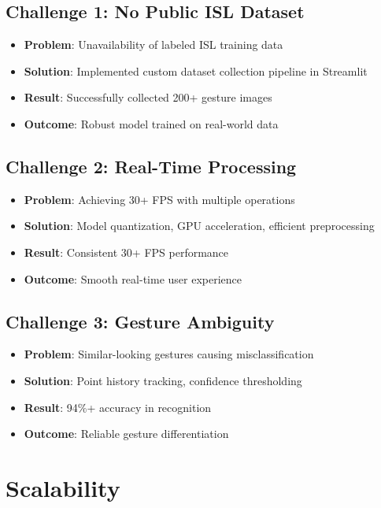 \subsection{Challenge 1: No Public ISL Dataset}

\begin{itemize}
    \item \textbf{Problem}: Unavailability of labeled ISL training data
    \item \textbf{Solution}: Implemented custom dataset collection pipeline in Streamlit
    \item \textbf{Result}: Successfully collected 200+ gesture images
    \item \textbf{Outcome}: Robust model trained on real-world data
\end{itemize}

\subsection{Challenge 2: Real-Time Processing}

\begin{itemize}
    \item \textbf{Problem}: Achieving 30+ FPS with multiple operations
    \item \textbf{Solution}: Model quantization, GPU acceleration, efficient preprocessing
    \item \textbf{Result}: Consistent 30+ FPS performance
    \item \textbf{Outcome}: Smooth real-time user experience
\end{itemize}

\subsection{Challenge 3: Gesture Ambiguity}

\begin{itemize}
    \item \textbf{Problem}: Similar-looking gestures causing misclassification
    \item \textbf{Solution}: Point history tracking, confidence thresholding
    \item \textbf{Result}: 94\%+ accuracy in recognition
    \item \textbf{Outcome}: Reliable gesture differentiation
\end{itemize}

\section{Scalability}

